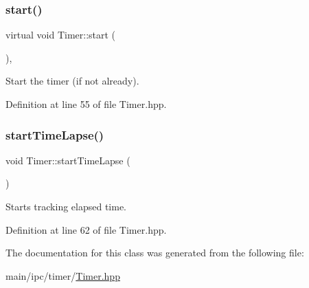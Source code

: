 \subsubsection{\texorpdfstring{start()}{start()}}
{\footnotesize\ttfamily virtual void Timer\+::start (\begin{DoxyParamCaption}{ }\end{DoxyParamCaption})\hspace{0.3cm}{\ttfamily [inline]}, {\ttfamily [virtual]}}

Start the timer (if not already). 

Definition at line 55 of file Timer.\+hpp.


\begin{DoxyCode}{0}

\end{DoxyCode}
\mbox{\label{classTimer_ac293413e966e4505b0cc20d47d5f1888}} 
\subsubsection{\texorpdfstring{startTimeLapse()}{startTimeLapse()}}
{\footnotesize\ttfamily void Timer\+::start\+Time\+Lapse (\begin{DoxyParamCaption}{ }\end{DoxyParamCaption})\hspace{0.3cm}{\ttfamily [inline]}}

Starts tracking elapsed time. 

Definition at line 62 of file Timer.\+hpp.


\begin{DoxyCode}{0}

\end{DoxyCode}


The documentation for this class was generated from the following file\+:\begin{DoxyCompactItemize}
\item 
main/ipc/timer/\mbox{\hyperlink{Timer_8hpp}{Timer.\+hpp}}\end{DoxyCompactItemize}
